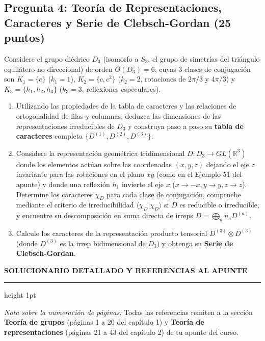 \documentclass[11pt, a4paper]{article}
\begin{document}
\subsection*{\textcolor{primary}{Pregunta 4: Teoría de Representaciones, Caracteres y Serie de Clebsch-Gordan (25 puntos)}}
Considere el grupo diédrico $D_3$ (isomorfo a $S_3$, el grupo de simetrías del triángulo equilátero no direccional) de orden $O(D_3) = 6$, cuyas $3$ clases de conjugación son $K_1 = \{e\}$ ($k_1 = 1$), $K_2 = \{c, c^2\}$ ($k_2 = 2$, rotaciones de $2\pi/3$ y $4\pi/3$) y $K_3 = \{h_1, h_2, h_3\}$ ($k_3 = 3$, reflexiones especulares).
\begin{enumerate}[label=\textbf{\alph*)}]
    \item Utilizando las propiedades de la tabla de caracteres y las relaciones de ortogonalidad de filas y columnas, deduzca las dimensiones de las representaciones irreducibles de $D_3$ y construya paso a paso su \textbf{tabla de caracteres} completa $\{D^{(1)}, D^{(2)}, D^{(3)}\}$.
    \item Considere la representación geométrica tridimensional $D: D_3 \to GL(\mathbb{R}^3)$ donde los elementos actúan sobre las coordenadas $(x,y,z)$ dejando el eje $z$ invariante para las rotaciones en el plano $xy$ (como en el Ejemplo 51 del apunte) y donde una reflexión $h_1$ invierte el eje $x$ ($x \to -x, y \to y, z \to z$). Determine los caracteres $\chi_D$ para cada clase de conjugación, compruebe mediante el criterio de irreducibilidad $\langle \chi_D | \chi_D \rangle$ si $D$ es reducible o irreducible, y encuentre su descomposición en suma directa de irreps $D = \bigoplus_a n_a D^{(a)}$.
    \item Calcule los caracteres de la representación producto tensorial $D^{(3)} \otimes D^{(3)}$ (donde $D^{(3)}$ es la irrep bidimensional de $D_3$) y obtenga su \textbf{Serie de Clebsch-Gordan}.
\end{enumerate}

\newpage

\begin{center}
    {\Large \textbf{\textcolor{primary}{SOLUCIONARIO DETALLADO Y REFERENCIAS AL APUNTE}}}
\end{center}
\vspace{1mm}
\hrule height 1pt
\vspace{3mm}

\noindent \textit{Nota sobre la numeración de páginas:} Todas las referencias remiten a la sección \textbf{Teoría de grupos} (páginas 1 a 20 del capítulo 1) y \textbf{Teoría de representaciones} (páginas 21 a 43 del capítulo 2) de tu apunte del curso.
\end{document}
